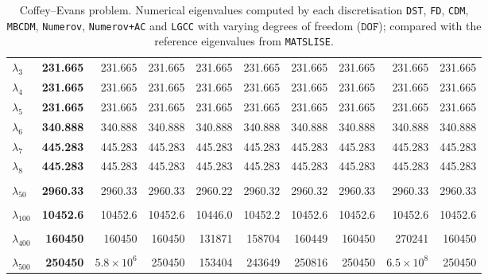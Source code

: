\begin{table}[htbp]
{{{\begin{tabular}{lrrrrrrrrr}
      $\lambda_{3}$ & \textbf{231.665} & 231.665 & 231.665 & 231.665 & 231.665 & 231.665 & 231.665 & 231.665 & 231.665 \\
      $\lambda_{4}$ & \textbf{231.665} & 231.665 & 231.665 & 231.665 & 231.665 & 231.665 & 231.665 & 231.665 & 231.665 \\
      $\lambda_{5}$ & \textbf{231.665} & 231.665 & 231.665 & 231.665 & 231.665 & 231.665 & 231.665 & 231.665 & 231.665 \\
      $\lambda_{6}$ & \textbf{340.888} & 340.888 & 340.888 & 340.888 & 340.888 & 340.888 & 340.888 & 340.888 & 340.888 \\
      $\lambda_{7}$ & \textbf{445.283} & 445.283 & 445.283 & 445.283 & 445.283 & 445.283 & 445.283 & 445.283 & 445.283 \\
      $\lambda_{8}$ & \textbf{445.283} & 445.283 & 445.283 & 445.283 & 445.283 & 445.283 & 445.283 & 445.283 & 445.283 \\
      & & & & & & & & & \\
      $\lambda_{50}$ & \textbf{2960.33} & 2960.33 & 2960.33 & 2960.22 & 2960.32 & 2960.32 & 2960.33 & 2960.33 & 2960.33 \\
      & & & & & & & & & \\
      $\lambda_{100}$ & \textbf{10452.6} & 10452.6 & 10452.6 & 10446.0 & 10452.2 & 10452.6 & 10452.6 & 10452.6 & 10452.6 \\
      & & & & & & & & & \\
      $\lambda_{400}$ & \textbf{160450} & 160450 & 160450 & 131871 & 158704 & 160449 & 160450 & 270241 & 160450 \\
      & & & & & & & & & \\
      $\lambda_{500}$ & \textbf{250450} & $5.8 \times 10^{6}$ & 250450 & 153404 & 243649 & 250816 & 250450 & $6.5 \times 10^{8}$ & 250450 \\
      \bottomrule
    \end{tabular}}}
  }
  \caption{Coffey--Evans problem. Numerical eigenvalues computed by each discretisation \texttt{DST}, \texttt{FD}, \texttt{CDM}, \texttt{MBCDM}, \texttt{Numerov}, \texttt{Numerov+AC} and \texttt{LGCC} with varying degrees of freedom ($\mathtt{DOF}$); compared with the reference eigenvalues from \texttt{MATSLISE}.}
  \label{tab:eigenvalues_head_coffey_evans_transposed}
\end{table}
